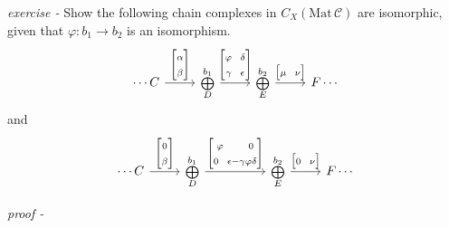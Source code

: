 \documentclass[11pt]{article}
\theoremstyle{definition}
\begin{document}
    \emph{exercise - } Show the following chain complexes in \(C_X(\text{Mat}\,\mathcal{C})\) are isomorphic, given that \(\varphi: b_1 \to b_2\) is an isomorphism.
    \begin{equation*}
        \begin{tikzcd}
            \cdots C \arrow[r,"{\begin{bmatrix} \alpha\\ \beta \end{bmatrix}}"] &\substack{b_1\\ \bigoplus \\ D} \arrow[r,"{\begin{bmatrix} \varphi \;\;\; \delta \\ \gamma \;\;\; \epsilon \end{bmatrix}}"] &\substack{b_2\\ \bigoplus \\ E} \arrow[r,"{\begin{bmatrix} \mu\;\;\;\nu \end{bmatrix}}"] &F \cdots
        \end{tikzcd}
    \end{equation*}
    and
    \begin{equation*}
        \begin{tikzcd}
            \cdots C \arrow[r,"{\begin{bmatrix} 0\\ \beta \end{bmatrix}}"] &\substack{b_1\\ \bigoplus \\ D} \arrow[rr,"{\begin{bmatrix} \varphi \quad\quad 0 \\ 0 \;\;\; \epsilon-\gamma \varphi \delta \end{bmatrix}}"] &&\substack{b_2\\ \bigoplus \\ E} \arrow[r,"{\begin{bmatrix} 0\;\;\;\nu \end{bmatrix}}"] &F \cdots
        \end{tikzcd}
    \end{equation*}

    \emph{proof - }


\end{document}

